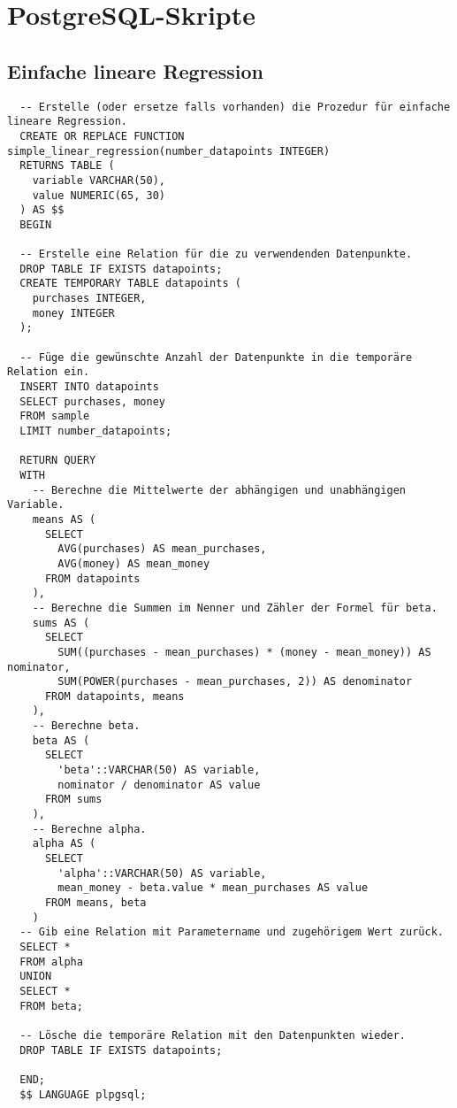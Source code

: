 \chapter{PostgreSQL-Skripte}
\label{appendix:E}

\section{Einfache lineare Regression}
\label{appendix:E:1}

\begin{verbatim}
  -- Erstelle (oder ersetze falls vorhanden) die Prozedur für einfache lineare Regression.
  CREATE OR REPLACE FUNCTION simple_linear_regression(number_datapoints INTEGER)
  RETURNS TABLE (
    variable VARCHAR(50),
    value NUMERIC(65, 30)
  ) AS $$
  BEGIN

  -- Erstelle eine Relation für die zu verwendenden Datenpunkte.
  DROP TABLE IF EXISTS datapoints;
  CREATE TEMPORARY TABLE datapoints (
    purchases INTEGER,
    money INTEGER
  );

  -- Füge die gewünschte Anzahl der Datenpunkte in die temporäre Relation ein.
  INSERT INTO datapoints
  SELECT purchases, money
  FROM sample
  LIMIT number_datapoints;

  RETURN QUERY
  WITH
    -- Berechne die Mittelwerte der abhängigen und unabhängigen Variable.
    means AS (
      SELECT
        AVG(purchases) AS mean_purchases,
        AVG(money) AS mean_money
      FROM datapoints
    ),
    -- Berechne die Summen im Nenner und Zähler der Formel für beta.
    sums AS (
      SELECT
        SUM((purchases - mean_purchases) * (money - mean_money)) AS nominator,
        SUM(POWER(purchases - mean_purchases, 2)) AS denominator
      FROM datapoints, means
    ),
    -- Berechne beta.
    beta AS (
      SELECT
        'beta'::VARCHAR(50) AS variable,
        nominator / denominator AS value
      FROM sums
    ),
    -- Berechne alpha.
    alpha AS (
      SELECT
        'alpha'::VARCHAR(50) AS variable,
        mean_money - beta.value * mean_purchases AS value
      FROM means, beta
    )
  -- Gib eine Relation mit Parametername und zugehörigem Wert zurück.
  SELECT *
  FROM alpha
  UNION
  SELECT *
  FROM beta;

  -- Lösche die temporäre Relation mit den Datenpunkten wieder.
  DROP TABLE IF EXISTS datapoints;

  END;
  $$ LANGUAGE plpgsql;
\end{verbatim}

